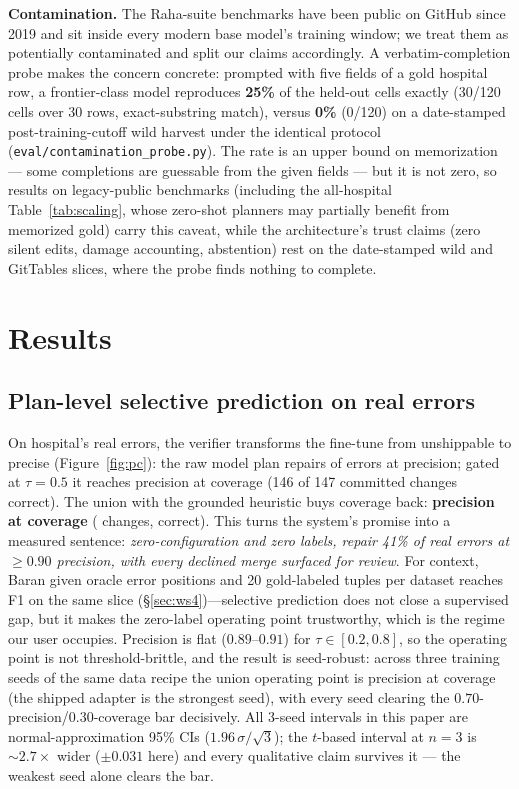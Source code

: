\documentclass[11pt]{article}
\begin{document}
\textbf{Contamination.} The Raha-suite benchmarks have been public on GitHub since
2019 and sit inside every modern base model's training window; we treat them as
potentially contaminated and split our claims accordingly. A verbatim-completion
probe makes the concern concrete: prompted with five fields of a gold hospital row,
a frontier-class model reproduces \textbf{25\%} of the held-out cells exactly
(30/120 cells over 30 rows, exact-substring match), versus \textbf{0\%} (0/120) on a
date-stamped post-training-cutoff wild harvest under the identical protocol
(\texttt{eval/contamination\_probe.py}). The rate is an upper bound on memorization
--- some completions are guessable from the given fields --- but it is not zero, so
results on legacy-public benchmarks (including the all-hospital
Table~\ref{tab:scaling}, whose zero-shot planners may partially benefit from
memorized gold) carry this caveat, while the architecture's trust claims
(zero silent edits, damage accounting, abstention) rest on the date-stamped wild
and GitTables slices, where the probe finds nothing to complete.

\section{Results}
\label{sec:results}

\subsection{Plan-level selective prediction on real errors}
\label{sec:ws1results}
On hospital's \hospErrors{} real errors, the verifier transforms the fine-tune from
unshippable to precise (Figure~\ref{fig:pc}): the raw model plan repairs
\hospModelRecallVSix{} of errors at \hospModelPrecVSix{} precision; gated at $\tau{=}0.5$ it
reaches \modelGatePrec{} precision at \modelGateCov{} coverage (146 of 147 committed
changes correct). The union with the grounded heuristic buys coverage back:
\textbf{\unionGatePrec{} precision at \unionGateCov{} coverage} (\unionChanged{}
changes, \unionFixed{} correct). This turns the system's promise into a measured
sentence: \emph{zero-configuration and zero labels, repair 41\% of real errors at
${\ge}0.90$ precision, with every declined merge surfaced for review}. For context,
Baran given oracle error positions and 20 gold-labeled tuples per dataset reaches
\realFBaran{} F1 on the same slice (\S\ref{sec:ws4})---selective prediction does not
close a supervised gap, but it makes the zero-label operating point trustworthy, which
is the regime our user occupies. Precision is flat ($0.89$--$0.91$) for
$\tau\in[0.2,0.8]$, so the operating point is not threshold-brittle, and the result is
seed-robust: across three training seeds of the same data recipe the union operating
point is \unionGateThreeSeedPrec{} precision at \unionGateThreeSeedCov{} coverage
(the shipped adapter is the strongest seed), with every seed clearing the
$0.70$-precision/$0.30$-coverage bar decisively. All 3-seed intervals in this paper
are normal-approximation 95\% CIs ($1.96\,\sigma/\sqrt{3}$); the $t$-based
interval at $n{=}3$ is ${\sim}2.7\times$ wider ($\pm 0.031$ here) and every
qualitative claim survives it --- the weakest seed alone clears the bar.
\end{document}
